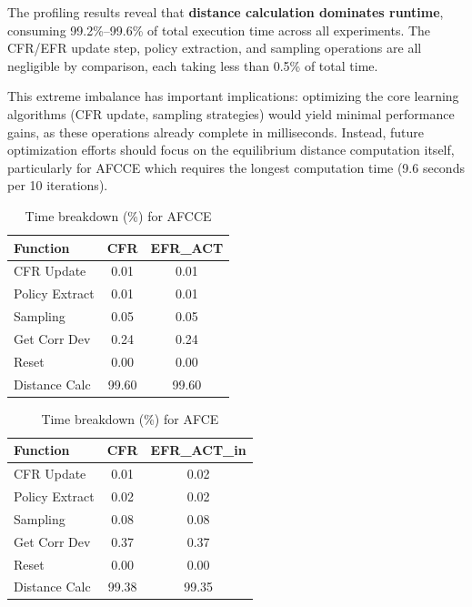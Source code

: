 \documentclass[11pt]{article}
\begin{document}
The profiling results reveal that \textbf{distance calculation dominates runtime}, consuming 99.2\%--99.6\% of total execution time across all experiments. The CFR/EFR update step, policy extraction, and sampling operations are all negligible by comparison, each taking less than 0.5\% of total time.

This extreme imbalance has important implications: optimizing the core learning algorithms (CFR update, sampling strategies) would yield minimal performance gains, as these operations already complete in milliseconds. Instead, future optimization efforts should focus on the equilibrium distance computation itself, particularly for AFCCE which requires the longest computation time (9.6 seconds per 10 iterations).

\begin{table}[H]
\centering
\caption{Time breakdown (\%) for AFCCE}
\label{tab:afcce_breakdown}
\begin{tabular}{lcc}
\toprule
Function & CFR & EFR\_ACT \\
\midrule
CFR Update & 0.01 & 0.01 \\
Policy Extract & 0.01 & 0.01 \\
Sampling & 0.05 & 0.05 \\
Get Corr Dev & 0.24 & 0.24 \\
Reset & 0.00 & 0.00 \\
Distance Calc & 99.60 & 99.60 \\
\bottomrule
\end{tabular}
\end{table}

\begin{table}[H]
\centering
\caption{Time breakdown (\%) for AFCE}
\label{tab:afce_breakdown}
\begin{tabular}{lcc}
\toprule
Function & CFR & EFR\_ACT\_in \\
\midrule
CFR Update & 0.01 & 0.02 \\
Policy Extract & 0.02 & 0.02 \\
Sampling & 0.08 & 0.08 \\
Get Corr Dev & 0.37 & 0.37 \\
Reset & 0.00 & 0.00 \\
Distance Calc & 99.38 & 99.35 \\
\bottomrule
\end{tabular}
\end{table}
\end{document}

